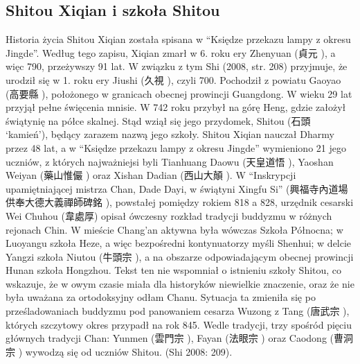 \subsection{Shitou Xiqian i szkoła Shitou}
Historia życia Shitou Xiqian została spisana w ``Księdze przekazu lampy z okresu Jingde''.
Według tego zapisu, Xiqian zmarł w 6. roku ery Zhenyuan (貞元 ), a więc 790, przeżywszy 91 lat.
W związku z tym Shi (2008, str. 208) przyjmuje, że urodził się w 1. roku ery Jiushi (久視 ), czyli 700.
Pochodził z powiatu Gaoyao (高要縣 ), położonego w granicach obecnej prowincji Guangdong.
W wieku 29 lat przyjął pełne święcenia mnisie.
W 742 roku przybył na górę Heng, gdzie założył świątynię na półce skalnej.
Stąd wziął się jego przydomek, Shitou (石頭  `kamień'), będący zarazem nazwą jego szkoły.
Shitou Xiqian nauczał Dharmy przez 48 lat, a w ``Księdze przekazu lampy z okresu Jingde'' wymieniono 21 jego uczniów, z których najważniejsi byli Tianhuang Daowu (天皇道悟 ), Yaoshan Weiyan (藥山惟儼 ) oraz Xishan Dadian (西山大顛 ).
W ``Inskrypcji upamiętniającej mistrza Chan, Dade Dayi, w świątyni Xingfu Si'' (興福寺內道場供奉大德大義禪師碑銘 ), powstałej pomiędzy rokiem 818 a 828, urzędnik cesarski Wei Chuhou (韋處厚) opisał ówczesny rozkład tradycji buddyzmu w różnych rejonach Chin.
W mieście Chang'an aktywna była wówczas Szkoła Północna; w Luoyangu szkoła Heze, a więc bezpośredni kontynuatorzy myśli Shenhui; w delcie Yangzi szkoła Niutou (牛頭宗 ), a na obszarze odpowiadającym obecnej prowincji Hunan szkoła Hongzhou.
Tekst ten nie wspomniał o istnieniu szkoły Shitou, co wskazuje, że w owym czasie miała dla historyków niewielkie znaczenie, oraz że nie była uważana za ortodoksyjny odłam Chanu.
Sytuacja ta zmieniła się po prześladowaniach buddyzmu pod panowaniem cesarza Wuzong z Tang (唐武宗 ), których szczytowy okres przypadł na rok 845.
Wedle tradycji, trzy spośród pięciu głównych tradycji Chan: Yunmen (雲門宗 ), Fayan (法眼宗 ) oraz Caodong (曹洞宗 ) wywodzą się od uczniów Shitou.
(Shi 2008: 209).

